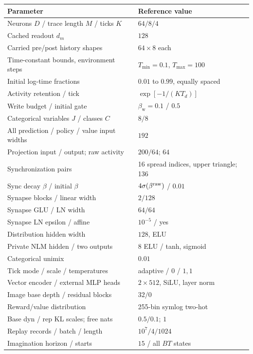\documentclass{article}
\begin{document}
\begin{table}[t]
\centering
\small
\begin{tabular}{@{}p{}p{}@{}}
\toprule
Parameter & Reference value\\
\midrule
Neurons $D$ / trace length $M$ / ticks $K$ & $64/8/4$\\
Cached readout $d_m$ & $128$\\
Carried pre/post history shapes & $64\times8$ each\\
Time-constant bounds, environment steps & $T_{\min}=0.1$, $T_{\max}=100$\\
Initial log-time fractions & $0.01$ to $0.99$, equally spaced\\
Activity retention / tick & $\exp[-1/(K T_d)]$\\
Write budget / initial gate & $\beta_{\mathrm w}=0.1$ / $0.5$\\
Categorical variables $J$ / classes $C$ & $8/8$\\
All prediction / policy / value input widths & $192$\\
Projection input / output; raw activity & $200/64$; $64$\\
Synchronization pairs & 16 spread indices, upper triangle; 136\\
Sync decay $\beta$ / initial $\beta$ & $4\sigma(\beta^{\rm raw})$ / $0.01$\\
Synapse blocks / linear width & $2/128$\\
Synapse GLU / LN width & $64/64$\\
Synapse LN epsilon / affine & $10^{-5}$ / yes\\
Distribution hidden width & $128$, ELU\\
Private NLM hidden / two outputs & $8$ ELU / tanh, sigmoid\\
Categorical unimix & $0.01$\\
Tick mode / scale / temperatures & adaptive / $0$ / $1,1$\\
\midrule
Vector encoder / external MLP heads & $2\times512$, SiLU, layer norm\\
Image base depth / residual blocks & $32/0$\\
Reward/value distribution & 255-bin symlog two-hot\\
Base dyn / rep KL scales; free nats & $0.5/0.1$; $1$\\
Replay records / batch / length & $10^7/4/1024$\\
Imagination horizon / starts & $15$ / all $B T$ states\\

\end{tabular}
\end{table}
\end{document}
